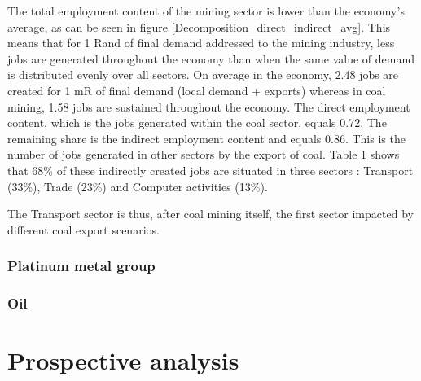 \documentclass[12pt,english]{article}
\begin{document}
%


The total employment content of the mining sector is lower than the economy's average, as can be seen in figure \ref{Decomposition_direct_indirect_avg}. This means that for 1 Rand of final demand addressed to the mining industry, less jobs are generated throughout the economy than when the same value of demand is distributed evenly over all sectors. On average in the economy, 2.48 jobs are created for 1 mR of final demand (local demand + exports) whereas in coal mining, 1.58 jobs are sustained throughout the economy. %
The direct employment content, which is the jobs generated within the coal sector, equals 0.72. The remaining share is the indirect employment content and equals 0.86. This is the number of jobs generated in other sectors by the export of coal. Table \ref{} shows that 68\% of these indirectly created jobs are situated in three sectors : Transport (33\%), Trade (23\%) and Computer activities (13\%). 

The Transport sector is thus, after coal mining itself, the first sector impacted by different coal export scenarios. 




\subsubsection{Platinum metal group}

\subsubsection{Oil}


\section{Prospective analysis}
\end{document}
